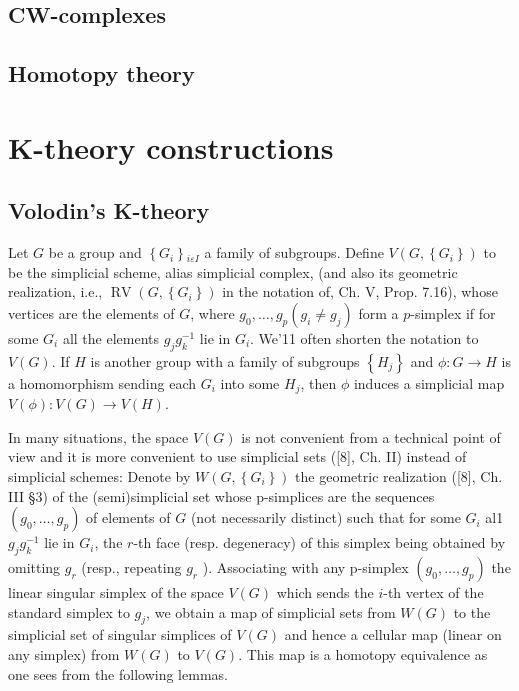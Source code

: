 \documentclass{book}
\begin{document}
\section{CW-complexes}

\section{Homotopy theory}





\chapter{K-theory constructions} 
\section{Volodin's K-theory}

Let $G$ be a group and $\left\{G_i\right\}{ }_{i \varepsilon I}$ a family of subgroups. Define $V\left(G,\left\{G_i\right\}\right)$ to be the simplicial scheme, alias simplicial complex, (and also its geometric realization, i.e., $\operatorname{RV}\left(G,\left\{G_i\right\}\right)$ in the notation of, Ch. V, Prop. 7.16), whose vertices are the elements of $G$, where $g_0, \ldots, g_p\left(g_i \neq g_j\right)$ form a $p$-simplex if for some $G_i$ all the elements $g_j g_k^{-1}$ lie in $G_i$. We'11 often shorten the notation to $V(G)$. If $H$ is another group with a family of subgroups $\left\{H_j\right\}$ and $\phi: G \rightarrow H$ is a homomorphism sending each $G_i$ into some $H_j$, then $\phi$ induces a simplicial map $V(\phi): V(G) \rightarrow V(H)$.

In many situations, the space $V(G)$ is not convenient from a technical point of view and it is more convenient to use simplicial sets ([8], Ch. II) instead of simplicial schemes: Denote by $W\left(G,\left\{G_i\right\}\right)$ the geometric realization ([8], Ch. III §3) of the (semi)simplicial set whose p-simplices are the sequences $\left(g_0, \ldots, g_p\right)$ of elements of $G$ (not necessarily distinct) such that for some $G_i$ al1 $g_j g_k^{-1}$ lie in $G_i$, the $r$-th face (resp. degeneracy) of this simplex being obtained by omitting $g_r$ (resp., repeating $g_r$ ). Associating with any p-simplex $\left(g_0, \ldots, g_p\right)$ the linear singular simplex of the space $V(G)$ which sends the $i$-th vertex of the standard simplex to $g_j$, we obtain a map of simplicial sets from $W(G)$ to the simplicial set of singular simplices of $V(G)$ and hence a cellular map (linear on any simplex) from $W(G)$ to $V(G)$. This map is a homotopy equivalence as one sees from the following lemmas.
\end{document}
